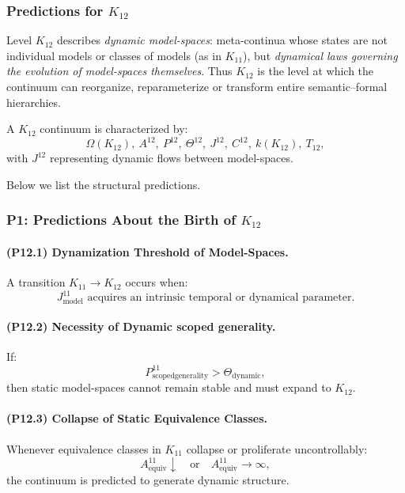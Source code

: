 

\subsubsection{Predictions for $K_{12}$}
\label{sec:predictions-k12}

Level $K_{12}$ describes \emph{dynamic model-spaces}:
meta-continua whose states are not individual models
or classes of models (as in $K_{11}$),
but \emph{dynamical laws governing the evolution of model-spaces themselves}.
Thus $K_{12}$ is the level at which the continuum
can reorganize, reparameterize or transform
entire semantic–formal hierarchies.

A $K_{12}$ continuum is characterized by:
\[
\Omega(K_{12}),\
A^{12},\
P^{12},\
\Theta^{12},\
J^{12},\
C^{12},\
k(K_{12}),\
T_{12},
\]
with $J^{12}$ representing dynamic flows between model-spaces.

Below we list the structural predictions.

\subsubsection{P1: Predictions About the Birth of $K_{12}$}

\paragraph{(P12.1) Dynamization Threshold of Model-Spaces.}
A transition $K_{11} \to K_{12}$ occurs when:
\[
J_{\mathrm{model}}^{11}
\text{ acquires an intrinsic temporal or dynamical parameter}.
\]

\paragraph{(P12.2) Necessity of Dynamic scoped generality.}
If:
\[
P_{\mathrm{scoped generality}}^{11} > \Theta_{\mathrm{dynamic}},
\]
then static model-spaces cannot remain stable and must expand to $K_{12}$.

\paragraph{(P12.3) Collapse of Static Equivalence Classes.}
Whenever equivalence classes in $K_{11}$ collapse or proliferate uncontrollably:
\[
A_{\mathrm{equiv}}^{11} \downarrow \quad \text{or}\quad
A_{\mathrm{equiv}}^{11} \to \infty,
\]
the continuum is predicted to generate dynamic structure.

